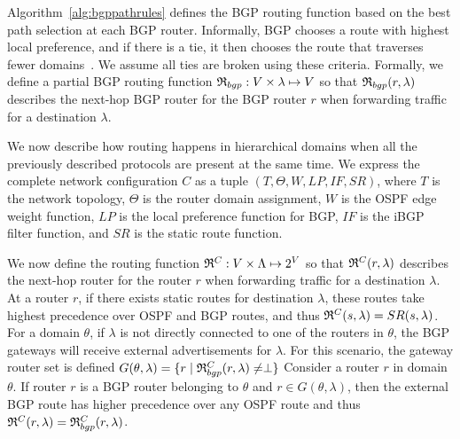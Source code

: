 Algorithm~\ref{alg:bgppathrules} defines the BGP routing function
based on the best path selection at each BGP router. 
Informally, BGP 
chooses a route with highest local preference, and
if there is a tie, it then chooses the route that traverses fewer domains~\cite{bgp}. 
We assume all ties 
are broken using these criteria. 
Formally, we define a partial BGP routing function 
$\mathfrak{R}_{bgp}: V \times \lambda \mapsto V$
so that
$\mathfrak{R}_{bgp}(r,\lambda)$
 describes the next-hop BGP router for
 the BGP
router $r$ when forwarding traffic for a destination $\lambda$. 

 We now describe how routing
happens in hierarchical domains when all the previously described protocols
are present at the same time.
We express the complete network configuration $C$
as a tuple $(T, \Theta,W,LP,IF,SR)$, where $T$ is the 
network topology, $\Theta$ is
the router domain assignment, $W$ is the OSPF
edge weight function,
$LP$  is the local preference function for BGP,
$IF$  is 
 the iBGP filter function, and 
 $SR$ is the static route
function.  

We now define the routing function 
$\mathfrak{R}^C: V \times \Lambda \mapsto 2^V$ 
so that
$\mathfrak{R}^C(r,\lambda)$
 describes the next-hop router for
 the 
router $r$ when forwarding traffic for a destination $\lambda$. 
At a router $r$, if there exists 
static routes for destination $\lambda$,
these routes take highest precedence over OSPF and BGP routes, 
and thus $\mathfrak{R}^C(s, \lambda) = SR(s, \lambda)$.
For a domain $\theta$, if $\lambda$ is not directly 
connected to one of the routers in $\theta$, the BGP 
gateways will receive external advertisements for $\lambda$.
For this scenario, the gateway router set is defined 
$G(\theta, \lambda) = \{r \mid \mathfrak{R}^C_{bgp}(r, \lambda) \not= \perp\}$
Consider a router $r$ in domain $\theta$. 
If router $r$ is a BGP router belonging to $\theta$ and $r \in G (\theta, \lambda)$, then the external BGP route has higher
precedence over any OSPF route and thus $\mathfrak{R}^C(r, \lambda)=\mathfrak{R}^C_{bgp}(r, \lambda)$. 

